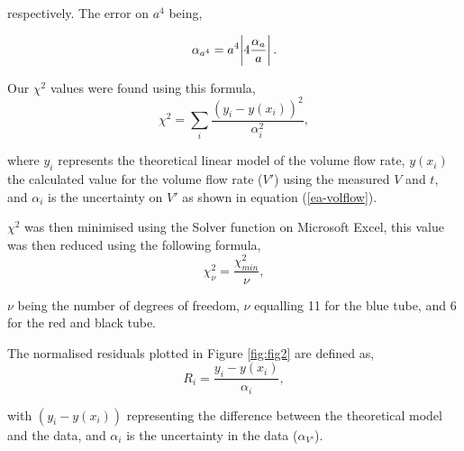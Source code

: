 \documentclass[twocolumn]{revtex4}
\begin{document}
respectively. The error on $a^4$ being, 

\begin{equation} 
\alpha_{a^4} = a^4 \abs{4 \frac{\alpha_a}{a}}.
\label{ea-tube}
\end{equation}

Our $\chi^2$ values were found using this formula, 
\begin{equation} 
\chi^2 = \sum_i \frac{(y_i - y(x_i))^2}{\alpha_i^2},
\label{ea-chisquared}
\end{equation}

where $y_i$ represents the theoretical linear model of the volume flow rate, $y(x_i)$ the calculated value for the volume flow rate ($V'$) using the measured $V$ and $t$, and $\alpha_i$ is the uncertainty on $V'$ as shown in equation (\ref{ea-volflow}).

$\chi^2$ was then minimised using the Solver function on Microsoft Excel, this value was then reduced using the following formula,
\begin{equation} 
\chi^2_{\nu} = \frac{\chi^2_{min}}{\nu},
\label{ea-redchisquared}
\end{equation}

$\nu$ being the number of degrees of freedom, $\nu$ equalling 11 for the blue tube, and 6 for the red and black tube.

The normalised residuals plotted in Figure \ref{fig:fig2} are defined as,
\begin{equation} 
R_i = \frac{y_i - y(x_i)}{\alpha_i},
\label{ea-normalisedresid}
\end{equation}

with $(y_i - y(x_i))$ representing the difference between the theoretical model and the data, and $\alpha_i$ is the uncertainty in the data ($\alpha_{V'}$).


\clearpage
\end{document}
